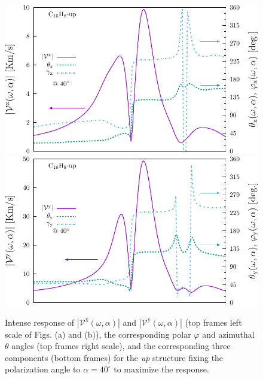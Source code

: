 \documentclass[prb,11pt,tightenlines,twocolumn,aps]{revtex4-1}
\begin{document}
\begin{figure}[t]
    \centering
    \includegraphics[width=\linewidth]{upplots/up-vxb-rtp-m2}
    \\ \vspace{4mm}
    \includegraphics[width=\linewidth]{upplots/up-vyb-rtp-m2}
    
    \caption{Intense response of
    $|\mathcal{V}^{\mathrm{x}}(\omega,\alpha)|$ and
    $|\mathcal{V}^{\mathrm{y}}(\omega,\alpha)|$ (top frames left scale of Figs.
    (a) and (b)), the corresponding polar $\varphi$ and azimuthal $\theta$
    angles (top frames right scale), and the corresponding three components
    (bottom frames) for the \emph{up} structure fixing the polarization angle
    to $\alpha=40^{\circ}$ to maximize the response.}

    \label{fig:up-vab-comp-rtp-2}
\end{figure}
\end{document}
